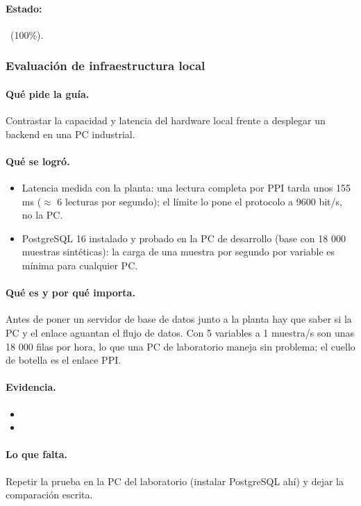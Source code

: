 \documentclass[a4paper,11pt]{article}
\begin{document}
\paragraph{Estado:} \cumple~(100\%).
\subsubsection{Evaluación de infraestructura local}
\paragraph{Qué pide la guía.} Contrastar la capacidad y latencia del hardware local frente a desplegar un backend en una PC industrial.
\paragraph{Qué se logró.}
\begin{itemize}
\item Latencia medida con la planta: una lectura completa por PPI tarda unos 155 ms ($\approx$ 6 lecturas por segundo); el límite lo pone el protocolo a 9600 bit/s, no la PC.
\item PostgreSQL 16 instalado y probado en la PC de desarrollo (base  con 18 000 muestras sintéticas): la carga de una muestra por segundo por variable es mínima para cualquier PC.
\end{itemize}
\paragraph{Qué es y por qué importa.} Antes de poner un servidor de base de datos junto a la planta hay que saber si la PC y el enlace aguantan el flujo de datos. Con 5 variables a 1 muestra/s son unas 18 000 filas por hora, lo que una PC de laboratorio maneja sin problema; el cuello de botella es el enlace PPI.
\paragraph{Evidencia.}
\begin{itemize}\small
\item {}
\item {}
\end{itemize}
\paragraph{Lo que falta.} Repetir la prueba en la PC del laboratorio (instalar PostgreSQL ahí) y dejar la comparación escrita.
\end{document}
